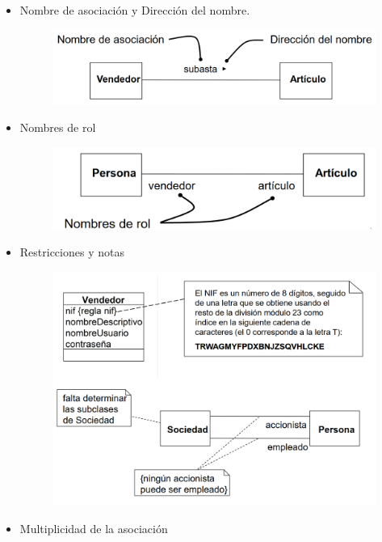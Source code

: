 \documentclass[12pt, twoside, openright]{report} %
\begin{document}
    \begin{itemize}	
    \item
      Nombre de asociación y Dirección del nombre.
	  \begin{figure}[H]
		{\includegraphics[scale=.3]{Untitled 15.png}}
	\end{figure}
    \item
      Nombres de rol
	  \begin{figure}[H]
		{\includegraphics[scale=.3]{Untitled 16.png}}
	\end{figure}
    \item
      Restricciones y notas
	  \begin{figure}[H]
		{\includegraphics[scale=.3]{Untitled 17.png}}
	\end{figure}
	\pagebreak
    \item
      Multiplicidad de la asociación


\end{itemize}
\end{document}
